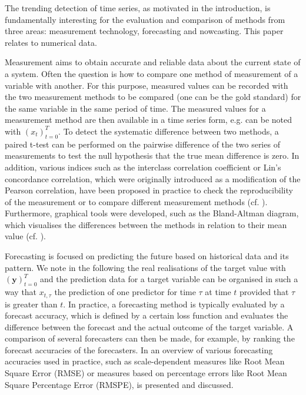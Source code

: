 The trending detection of time series, as motivated in the introduction, is fundamentally interesting for the evaluation and comparison of methods from three areas: measurement technology, forecasting and nowcasting. This paper relates to numerical data.

Measurement aims to obtain accurate and reliable data about the current state of a system. Often the question is how to compare one method of measurement of a variable with another. For this purpose, measured values can be recorded with the two measurement methods to be compared (one can be the gold standard) for the same variable in the same period of time. The measured values for a measurement method are then available in a time series form, e.g. can be noted with $(x_t)^T_{t=0}$. To detect the systematic difference between two methods, a paired t-test can be performed on the pairwise difference of the two series of measurements to test the null hypothesis that the true mean difference is zero\cite{watson2010method}. In addition, various indices such as the interclass correlation coefficient or Lin's concordance correlation, which were originally introduced as a modification of the Pearson correlation, have been proposed in practice to check the reproducibility of the measurement or to compare different measurement methods (cf. \cite{lawrence1989concordance,koo2016guideline,}). Furthermore, graphical tools were developed, such as the
Bland-Altman diagram, which visualises the differences between the methods in relation to their mean value (cf. \cite{bland1986statistical}).

Forecasting is focused on predicting the future based on historical data and its pattern. We note in the following the real realisations of the target value with $(\mathbf{y})^T_{t=0}$ and the prediction data for a target variable  can be organised in such a way that $x_{t,\tau}$ the prediction of one predictor for time $\tau$ at time $t$ provided that $\tau$ is greater than $t$. In practice, a forecasting method is typically evaluated by a forecast accuracy, which is defined by a certain loss function and evaluates the difference between the forecast and the actual outcome of the target variable. A comparison of several forecasters can then be made, for example, by ranking the forecast accuracies of the forecasters. In \cite{hyndman2006another} an overview of various forecasting accuracies used in practice, such as scale-dependent measures like Root Mean Square Error (RMSE) or measures based on percentage errors like Root Mean Square Percentage Error (RMSPE), is presented and discussed. 

